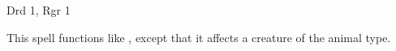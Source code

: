 
\begin{description*}
\item[Level:] Drd 1, Rgr 1
\end{description*}

This spell functions like , except that it affects a creature
of the animal type.